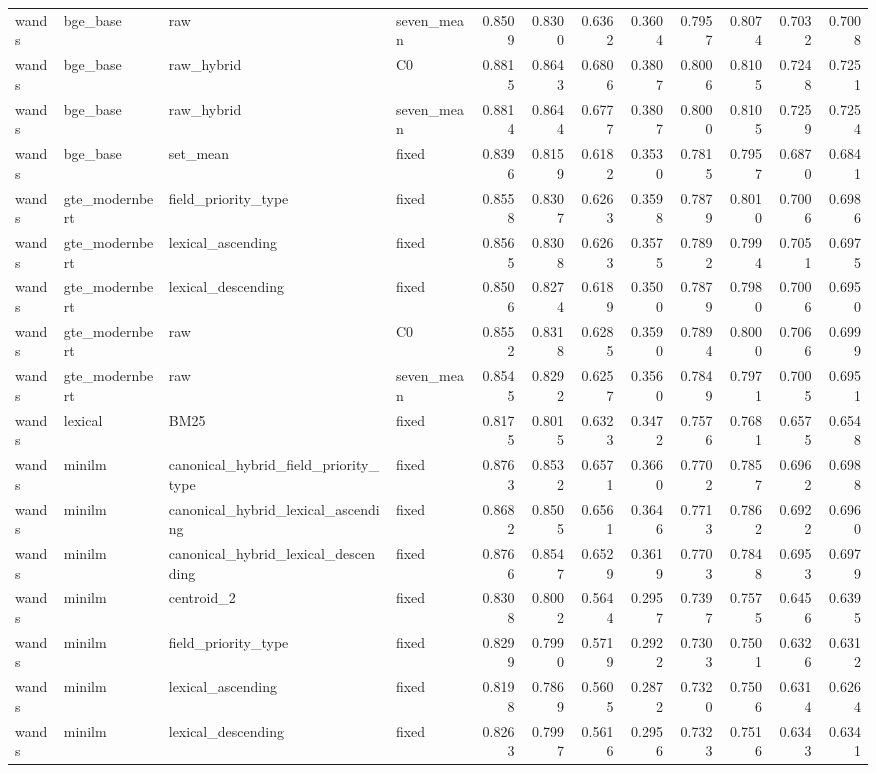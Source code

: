 \begin{longtable}{llllrrrrrrrr}
wands & bge\_base & raw & seven\_mean & 0.8509 & 0.8300 & 0.6362 & 0.3604 & 0.7957 & 0.8074 & 0.7032 & 0.7008 \\
wands & bge\_base & raw\_hybrid & C0 & 0.8815 & 0.8643 & 0.6806 & 0.3807 & 0.8006 & 0.8105 & 0.7248 & 0.7251 \\
wands & bge\_base & raw\_hybrid & seven\_mean & 0.8814 & 0.8644 & 0.6777 & 0.3807 & 0.8000 & 0.8105 & 0.7259 & 0.7254 \\
wands & bge\_base & set\_mean & fixed & 0.8396 & 0.8159 & 0.6182 & 0.3530 & 0.7815 & 0.7957 & 0.6870 & 0.6841 \\
wands & gte\_modernbert & field\_priority\_type & fixed & 0.8558 & 0.8307 & 0.6263 & 0.3598 & 0.7879 & 0.8010 & 0.7006 & 0.6986 \\
wands & gte\_modernbert & lexical\_ascending & fixed & 0.8565 & 0.8308 & 0.6263 & 0.3575 & 0.7892 & 0.7994 & 0.7051 & 0.6975 \\
wands & gte\_modernbert & lexical\_descending & fixed & 0.8506 & 0.8274 & 0.6189 & 0.3500 & 0.7879 & 0.7980 & 0.7006 & 0.6950 \\
wands & gte\_modernbert & raw & C0 & 0.8552 & 0.8318 & 0.6285 & 0.3590 & 0.7894 & 0.8000 & 0.7066 & 0.6999 \\
wands & gte\_modernbert & raw & seven\_mean & 0.8545 & 0.8292 & 0.6257 & 0.3560 & 0.7849 & 0.7971 & 0.7005 & 0.6951 \\
wands & lexical & BM25 & fixed & 0.8175 & 0.8015 & 0.6323 & 0.3472 & 0.7576 & 0.7681 & 0.6575 & 0.6548 \\
wands & minilm & canonical\_hybrid\_field\_priority\_type & fixed & 0.8763 & 0.8532 & 0.6571 & 0.3660 & 0.7702 & 0.7857 & 0.6962 & 0.6988 \\
wands & minilm & canonical\_hybrid\_lexical\_ascending & fixed & 0.8682 & 0.8505 & 0.6561 & 0.3646 & 0.7713 & 0.7862 & 0.6922 & 0.6960 \\
wands & minilm & canonical\_hybrid\_lexical\_descending & fixed & 0.8766 & 0.8547 & 0.6529 & 0.3619 & 0.7703 & 0.7848 & 0.6953 & 0.6979 \\
wands & minilm & centroid\_2 & fixed & 0.8308 & 0.8002 & 0.5644 & 0.2957 & 0.7397 & 0.7575 & 0.6456 & 0.6395 \\
wands & minilm & field\_priority\_type & fixed & 0.8299 & 0.7990 & 0.5719 & 0.2922 & 0.7303 & 0.7501 & 0.6326 & 0.6312 \\
wands & minilm & lexical\_ascending & fixed & 0.8198 & 0.7869 & 0.5605 & 0.2872 & 0.7320 & 0.7506 & 0.6314 & 0.6264 \\
wands & minilm & lexical\_descending & fixed & 0.8263 & 0.7997 & 0.5616 & 0.2956 & 0.7323 & 0.7516 & 0.6343 & 0.6341 \\

\end{longtable}
